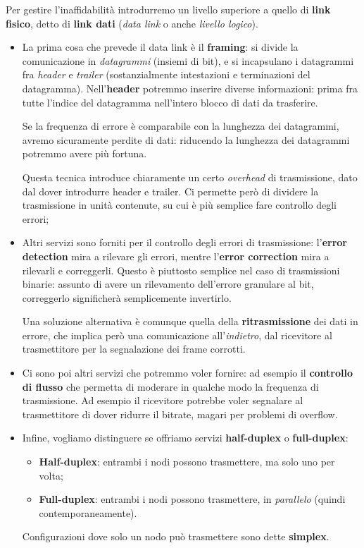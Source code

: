 \documentclass[a4paper,11pt]{article}
\begin{document}
Per gestire l'inaffidabilità introdurremo un livello superiore a quello di \textbf{link fisico}, detto di \textbf{link dati} (\textit{data link} o anche \textit{livello logico}).
\begin{itemize}
	\item La prima cosa che prevede il data link è il \textbf{framing}: si divide la comunicazione in \textit{datagrammi} (insiemi di bit), e si incapsulano i datagrammi fra \textit{header} e \textit{trailer} (sostanzialmente intestazioni e terminazioni del datagramma).
		Nell'\textbf{header} potremmo inserire diverse informazioni: prima fra tutte l'indice del datagramma nell'intero blocco di dati da trasferire.
		
		Se la frequenza di errore è comparabile con la lunghezza dei datagrammi, avremo sicuramente perdite di dati: riducendo la lunghezza dei datagrammi potremmo avere più fortuna.

		Questa tecnica introduce chiaramente un certo \textit{overhead} di trasmissione, dato dal dover introdurre header e trailer. Ci permette però di dividere la trasmissione in unità contenute, su cui è più semplice fare controllo degli errori;
	\item Altri servizi sono forniti per il controllo degli errori di trasmissione: l'\textbf{error detection} mira a rilevare gli errori, mentre l'\textbf{error correction} mira a rilevarli e correggerli. Questo è piuttosto semplice nel caso di trasmissioni binarie: assunto di avere un rilevamento dell'errore granulare al bit, correggerlo significherà semplicemente invertirlo.
		
		Una soluzione alternativa è comunque quella della \textbf{ritrasmissione} dei dati in errore, che implica però una comunicazione all'\textit{indietro}, dal ricevitore al trasmettitore per la segnalazione dei frame corrotti.

	\item Ci sono poi altri servizi che potremmo voler fornire: ad esempio il \textbf{controllo di flusso} che permetta di moderare in qualche modo la frequenza di trasmissione. Ad esempio il ricevitore potrebbe voler segnalare al trasmettitore di dover ridurre il bitrate, magari per problemi di overflow.

	\item Infine, vogliamo distinguere se offriamo servizi \textbf{half-duplex} o \textbf{full-duplex}:
		\begin{itemize}
			\item \textbf{Half-duplex}: entrambi i nodi possono trasmettere, ma solo uno per volta;
			\item \textbf{Full-duplex}: entrambi i nodi possono trasmettere, in \textit{parallelo} (quindi contemporaneamente).
		\end{itemize}

		Configurazioni dove solo un nodo può trasmettere sono dette \textbf{simplex}.
\end{itemize}
\end{document}
